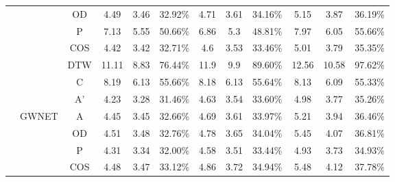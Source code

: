 \begin{table}[t!]
\begin{center}
{\begin{tabular}{c|c|c|ccc|ccc|ccc}
                                                 &                        & OD                      & 4.49       & 3.46      & 32.92\%     & 4.71      & 3.61      & 34.16\%     & 5.15       & 3.87       & 36.19\%     \\
                                                 &                        & P                       & 7.13       & 5.55      & 50.66\%     & 6.86      & 5.3       & 48.81\%     & 7.97       & 6.05       & 55.66\%     \\
                                                 &                        & COS                     & 4.42       & 3.42      & 32.71\%     & 4.6       & 3.53      & 33.46\%     & 5.01       & 3.79       & 35.35\%     \\
                                                 &                        & DTW                     & 11.11      & 8.83      & 76.44\%     & 11.9      & 9.9       & 89.60\%     & 12.56      & 10.58      & 97.62\%     \\
                                                 &                        & C                       & 8.19       & 6.13      & 55.66\%     & 8.18      & 6.13      & 55.64\%     & 8.13       & 6.09       & 55.33\%     \\
                                                 &                        & A'                      & 4.23       & 3.28      & 31.46\%     & 4.63      & 3.54      & 33.60\%     & 4.98       & 3.77       & 35.26\%     \\
                \cline{2-12}
                                                 & \multirow{7}{*}{GWNET} & A                       & 4.45       & 3.45      & 32.66\%     & 4.69      & 3.61      & 33.97\%     & 5.21       & 3.94       & 36.46\%     \\
                                                 &                        & OD                      & 4.51       & 3.48      & 32.76\%     & 4.78      & 3.65      & 34.04\%     & 5.45       & 4.07       & 36.81\%     \\
                                                 &                        & P                       & 4.31       & 3.34      & 32.00\%     & 4.58      & 3.51      & 33.44\%     & 4.93       & 3.73       & 34.93\%     \\
                                                 &                        & COS                     & 4.48       & 3.47      & 33.12\%     & 4.86      & 3.72      & 34.94\%     & 5.48       & 4.12       & 37.78\%     \\

\end{tabular}}
\end{center}
\end{table}
